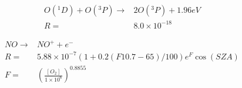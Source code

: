 \documentclass[twoside,10pt]{book}
\begin{document}
\begin{equation}
\begin{split}
O(^1D) + O(^3P) \rightarrow & 2O(^3P) + 1.96 eV\\
R = & 8.0 \times 10^{-18}
\end{split}
\end{equation}

\begin{equation}
\begin{split}
NO \rightarrow & NO^+ + e^-\\
R = & 5.88 \times 10^{-7}(1+0.2(F10.7-65)/100)e^F\cos(SZA)\\
F = & (\frac{[O_2]}{1\times 10^{6}})^{0.8855}
\end{split}
\end{equation}


\clearpage
{}


\end{document}
